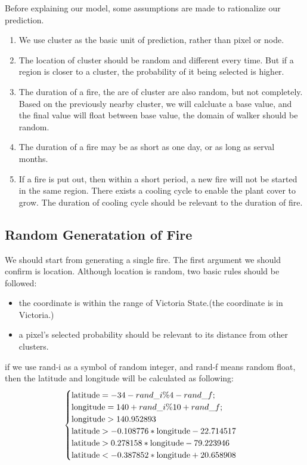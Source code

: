 \documentclass{mcmthesis}
\begin{document}
Before explaining our model, some assumptions are made to rationalize our prediction.\cite{pham2018distributed}
\begin{enumerate}
	\item We use cluster as the basic unit of prediction, rather than pixel or node.
	\item The location of cluster should be random and different every time. But if a region is closer to a cluster, the probability of it being selected is higher.
	\item The duration of a ﬁre, the are of cluster are also random, but not completely. Based on the  previously nearby cluster, we will calcluate a base value, and the ﬁnal value will ﬂoat between  base value, the domain of walker should be random.
	\item The duration of a ﬁre may be as short as one day, or as long as serval months.
	\item If a fire is put out, then within a short period, a new fire will not be started in the same region. There exists a cooling cycle to enable the plant cover to grow. The duration of cooling cycle should be relevant to the duration  of ﬁre.
\end{enumerate}

\subsection{Random Generatation of Fire}
We should start from generating a single ﬁre. The ﬁrst argument we should conﬁrm is location. Although location is random, two basic rules should be followed:\cite{Malandrino_2019}
\begin{itemize}
	\item the coordinate is within the range of Victoria State.(the coordinate is in Victoria.)
	\item a pixel’s selected probability should be relevant to its distance from other clusters.
\end{itemize}
if we use rand-i as a symbol of random integer, and rand-f means random ﬂoat, then the latitude and longitude will be calculated as following:
\begin{equation}
	\begin{cases}
		{\rm latitude} = -34-rand\_i\%4-rand\_f; \\
		{\rm longitude} = 140+rand\_i\%10+rand\_f;\\
		{\rm longitude} > 140.952893 \\
		{\rm latitude} > -0.108776*{\rm longitude}-22.714517 \\
		{\rm latitude} > 0.278158*{\rm longitude}-79.223946 \\
		{\rm latitude} < -0.387852*{\rm longitude}+20.658908
	\end{cases}
\end{equation}
\end{document}
